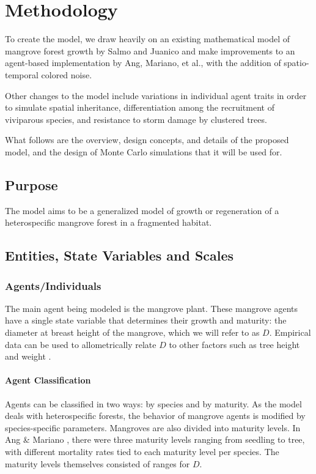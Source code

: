 \section{Methodology}

To create the model, we draw heavily on an existing mathematical model of mangrove forest growth by Salmo and Juanico \cite{mangroveModelPaper} and make improvements to an agent-based implementation by Ang, Mariano, et al.\cite{mangrovesAngMariano}, with the addition of spatio-temporal colored noise. 

Other changes to the model include variations in individual agent traits in order to simulate spatial inheritance, differentiation among the recruitment of viviparous species, and resistance to storm damage by clustered trees.

What follows are the overview, design concepts, and details of the proposed model, and the design of Monte Carlo simulations that it will be used for.

\subsection{Purpose}
The model aims to be a generalized model of growth or regeneration of a heterospecific mangrove forest in a fragmented habitat.

\subsection{Entities, State Variables and Scales}
\subsubsection{Agents/Individuals}
The main agent being modeled is the mangrove plant. These mangrove agents have a single state variable that determines their growth and maturity: the diameter at breast height of the mangrove, which we will refer to as $D$. Empirical data can be used to allometrically relate $D$ to other factors such as tree height and weight \cite{komiyama2005}.

\paragraph{Agent Classification}
Agents can be classified in two ways: by species and by maturity. As the model deals with heterospecific forests, the behavior of mangrove agents is modified by species-specific parameters. Mangroves are also divided into maturity levels. In Ang \& Mariano \cite{mangrovesAngMariano}, there were three maturity levels ranging from seedling to tree, with different mortality rates tied to each maturity level per species. The maturity levels themselves consisted of ranges for $D$.

